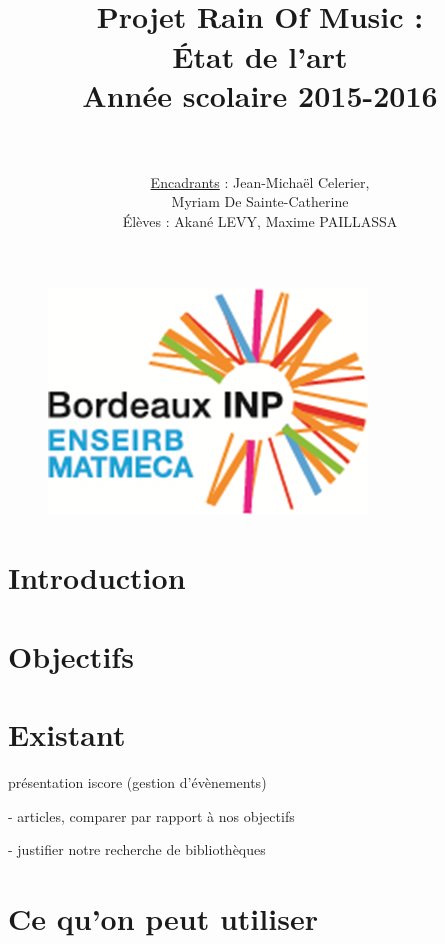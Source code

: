 \documentclass[paper=a4,12pt]{article}
\title{
  \horrule{1.5pt} \\[0.5cm]	
  \Huge \textbf{Projet Rain Of Music : \\ État de l'art} \\ [20pt]
    \LARGE Année scolaire 2015-2016 \\ 
  \horrule{1.5pt} \\[0.5cm]
}
\author{						
    \LARGE \underline{Encadrants} : Jean-Michaël Celerier, \\
   					\LARGE	\hspace{5cm} Myriam De Sainte-Catherine\\			
   	\vspace{1cm} 
   	\normalfont
   	\LARGE Élèves :  Akané LEVY, Maxime PAILLASSA    
}
\date{}
\numberwithin{equation}{section}		%
\numberwithin{figure}{section}			%
\numberwithin{table}{section}				%
\begin{document}
\graphicspath{{./imgs/}{.}}
\maketitle

\begin{figure}[H]
  \centering\includegraphics[scale=1.2]{logo_enseirb.png}
\end{figure}

\newpage

\tableofcontents

\newpage
\normalsize

\section{Introduction}


\section{Objectifs}



\section{Existant}
présentation iscore (gestion d'évènements)



- articles, comparer par rapport à nos objectifs 

- justifier notre recherche de bibliothèques



\section{Ce qu'on peut utiliser}



%
\end{document}
